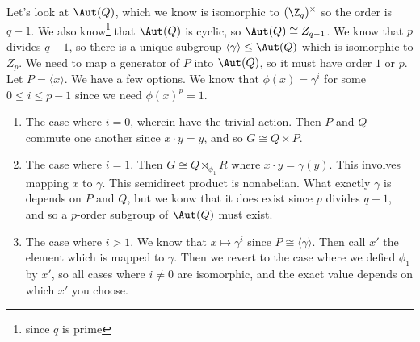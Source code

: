 Let's look at $\Aut(Q)$, which we know is isomorphic to $(\Z_q)^\times$ so the order is $q-1$. We also know\footnote{since $q$ is prime} that $\Aut(Q)$ is cyclic, so $\Aut(Q) \cong Z_{q-1}$. We know that $p$ divides $q-1$, so there is a unique subgroup $\langle \gamma \rangle \leq \Aut(Q)$ which is isomorphic to $Z_p$. We need to map a generator of $P$ into $\Aut(Q)$, so it must have order $1$ or $p$. Let $P = \langle x \rangle$. We have a few options. We know that $\phi(x) = \gamma^i$ for some $0 \leq i \leq p-1$ since we need $\phi(x)^p = 1$.
\begin{enumerate}
\item The case where $i = 0$, wherein have the trivial action. Then $P$ and $Q$ commute one another since $x \cdot y = y$, and so $G \cong Q \times P$.

\item The case where $i = 1$. Then $G \cong Q \rtimes_{\phi_1} R$ where $x \cdot y = \gamma(y)$. This involves mapping $x$ to $\gamma$. This semidirect product is nonabelian. What exactly $\gamma$ is depends on $P$ and $Q$, but we konw that it does exist since $p$ divides $q-1$, and so a $p$-order subgroup of $\Aut(Q)$ must exist.

\item The case where $i > 1$. We know that $x \mapsto \gamma^i$ since $P \cong \langle \gamma \rangle$. Then call $x'$ the element which is mapped to $\gamma$. Then we revert to the case where we defied $\phi_1$ by $x'$, so all cases where $i \not= 0$ are isomorphic, and the exact value depends on which $x'$ you choose. 
\end{enumerate}
